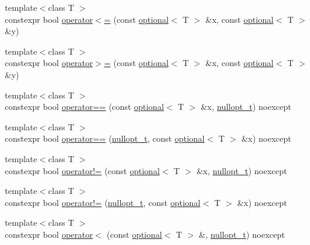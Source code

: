 \begin{DoxyCompactItemize}
\item 
{\footnotesize template$<$class T $>$ }\\constexpr bool \mbox{\hyperlink{namespacestd_1_1experimental_afd5e1ebb8edd29dc3916bf546c9ffca3}{operator$<$=}} (const \mbox{\hyperlink{classstd_1_1experimental_1_1optional}{optional}}$<$ T $>$ \&x, const \mbox{\hyperlink{classstd_1_1experimental_1_1optional}{optional}}$<$ T $>$ \&y)
\item 
{\footnotesize template$<$class T $>$ }\\constexpr bool \mbox{\hyperlink{namespacestd_1_1experimental_a2c2515ef0e94b6089f60aaf6757741c9}{operator$>$=}} (const \mbox{\hyperlink{classstd_1_1experimental_1_1optional}{optional}}$<$ T $>$ \&x, const \mbox{\hyperlink{classstd_1_1experimental_1_1optional}{optional}}$<$ T $>$ \&y)
\item 
{\footnotesize template$<$class T $>$ }\\constexpr bool \mbox{\hyperlink{namespacestd_1_1experimental_a4f15144833bc5951b01fbd4b4bfdb6fb}{operator==}} (const \mbox{\hyperlink{classstd_1_1experimental_1_1optional}{optional}}$<$ T $>$ \&x, \mbox{\hyperlink{structstd_1_1experimental_1_1nullopt__t}{nullopt\+\_\+t}}) noexcept
\item 
{\footnotesize template$<$class T $>$ }\\constexpr bool \mbox{\hyperlink{namespacestd_1_1experimental_a23a59ad403fb2809087806ff9037d42e}{operator==}} (\mbox{\hyperlink{structstd_1_1experimental_1_1nullopt__t}{nullopt\+\_\+t}}, const \mbox{\hyperlink{classstd_1_1experimental_1_1optional}{optional}}$<$ T $>$ \&x) noexcept
\item 
{\footnotesize template$<$class T $>$ }\\constexpr bool \mbox{\hyperlink{namespacestd_1_1experimental_a768f39fe88fcf07a351e8f45d6dfb1b3}{operator!=}} (const \mbox{\hyperlink{classstd_1_1experimental_1_1optional}{optional}}$<$ T $>$ \&x, \mbox{\hyperlink{structstd_1_1experimental_1_1nullopt__t}{nullopt\+\_\+t}}) noexcept
\item 
{\footnotesize template$<$class T $>$ }\\constexpr bool \mbox{\hyperlink{namespacestd_1_1experimental_aa340c9c2a57fd083695e470ded11c089}{operator!=}} (\mbox{\hyperlink{structstd_1_1experimental_1_1nullopt__t}{nullopt\+\_\+t}}, const \mbox{\hyperlink{classstd_1_1experimental_1_1optional}{optional}}$<$ T $>$ \&x) noexcept
\item 
{\footnotesize template$<$class T $>$ }\\constexpr bool \mbox{\hyperlink{namespacestd_1_1experimental_aa7075b9ff2db35978c50e744de295b37}{operator$<$}} (const \mbox{\hyperlink{classstd_1_1experimental_1_1optional}{optional}}$<$ T $>$ \&, \mbox{\hyperlink{structstd_1_1experimental_1_1nullopt__t}{nullopt\+\_\+t}}) noexcept

\end{DoxyCompactItemize}
